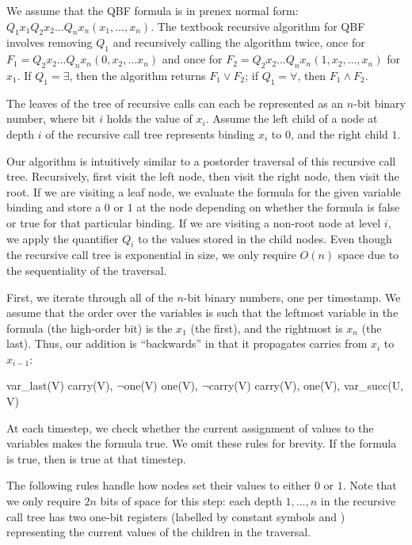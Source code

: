 We assume that the QBF formula is in prenex normal form: $Q_1 x_1 Q_2 x_2 \ldots Q_n x_n(x_1, \ldots, x_n)$.  The textbook recursive algorithm for QBF~\cite{garey-johnson} involves removing $Q_1$ and recursively calling the algorithm twice, once for $F_1 = Q_2 x_2 \ldots Q_n x_n(0, x_2, \ldots x_n)$ and once for $F_2 = Q_2 x_2 \ldots Q_n x_n(1, x_2, \ldots, x_n)$ for $x_1$.  If $Q_1 = \exists$, then the algorithm returns $F_1 \lor F_2$; if $Q_1 = \forall$, then $F_1 \land F_2$.

The leaves of the tree of recursive calls can each be represented as an $n$-bit binary number, where bit $i$ holds the value of $x_i$.  Assume the left child of a node at depth $i$ of the recursive call tree represents binding $x_{i}$ to $0$, and the right child $1$.

Our algorithm is intuitively similar to a postorder traversal of this recursive call tree.  Recursively, first visit the left node, then visit the right node, then visit the root.  If we are visiting a leaf node, we evaluate the formula for the given variable binding and store a $0$ or $1$ at the node depending on whether the formula is false or true for that particular binding.  If we are visiting a non-root node at level $i$, we apply the quantifier $Q_i$ to the values stored in the child nodes.  Even though the recursive call tree is exponential in size, we only require $O(n)$ space due to the sequentiality of the traversal.

First, we iterate through all of the $n$-bit binary numbers, one per timestamp.  We assume that the order over the variables is such that the leftmost variable in the formula (the high-order bit) is the $x_1$ (the first), and the rightmost is $x_n$ (the last).  Thus, our addition is ``backwards'' in that it propagates carries from $x_i$ to $x_{i-1}$:

\begin{Drules}
        {var_last(V)}
        {carry(V), $\lnot$one(V)}
  {one(V), $\lnot$carry(V)}
        {carry(V), one(V), var_succ(U, V)}
\end{Drules}

At each timestep, we check whether the current assignment of values to the variables makes the formula true.  We omit these rules for brevity.  If the formula is true, then  is true at that timestep.

The following rules handle how nodes set their values to either $0$ or $1$.  Note that we only require $2n$ bits of space for this step: each depth $1,\ldots,n$ in the recursive call tree has two one-bit registers (labelled by constant symbols  and ) representing the current values of the children in the traversal.

